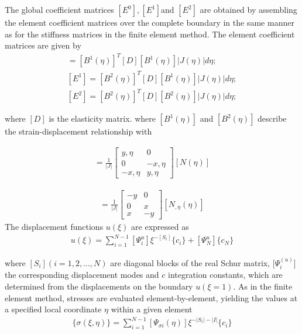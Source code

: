 \documentclass[12pt]{article}
\begin{document}
The global coefficient matrices $[E^0], [E^1 ] $and $[E^2 ]$ are obtained by assembling the element coefficient matrices over the 
complete boundary in the same manner as for the stiffness matrices in the finite element method. The element coefficient 
matrices are given by
\begin{align*}
    [E^0] = [B^1(\eta)]^T[D][B^1(\eta)]|J(\eta)|d\eta;\\
    [E^1] = [B^2(\eta)]^T[D][B^1(\eta)]|J(\eta)|d\eta; \tag{24} \label{24}\\
    [E^2] = [B^2(\eta)]^T[D][B^2(\eta)]|J(\eta)|d\eta; 
\end{align*}


where $[D]$ is the elasticity matrix. where $[B^1(\eta)]$ and $[B^2(\eta)]$ describe the strain-displacement relationship with

\begin{align*}
    [B^1] = \frac{1}{|J|} \begin{bmatrix}
        y,\eta & 0\\
        0 &-x,\eta\\    
        -x,\eta & y,\eta
    \end{bmatrix}
    [N(\eta)]
\end{align*}

\begin{align*}
    [B^2] = \frac{1}{|J|} \begin{bmatrix}
        -y & 0\\
        0 &x\\    
        x & -y
    \end{bmatrix}
    [N_{,\eta}(\eta)]
\end{align*}
The displacement functions {$u(\xi)$} are expressed as
\begin{align*}
    u(\xi) = \sum_{ i = 1}^{N-1} [\varPsi_{i}^{u}]\xi^{-[S_i]}\{c_i\} + [\varPsi_{N}^{u}]\{c_N\} \tag{25}
\end{align*}


where $[S_i](i = 1, 2, . . . , N)$ are diagonal blocks of the real Schur matrix, [$\varPsi _{i}^{(u)}$] the corresponding displacement modes and {$c$}
integration constants, which are determined from the displacements on the boundary {$u(\xi = 1)$}. As in the finite element
method, stresses are evaluated element-by-element, yielding the values at a specified local coordinate $\eta$ within a given
element
\begin{align*}
    \{\sigma(\xi, \eta)\} = \sum_{i = 1}^{N-1}[\varPsi_{\sigma i}(\eta)]\xi^{-|S_i| - |I|}\{c_i\} \tag{26}
\end{align*}
\end{document}
